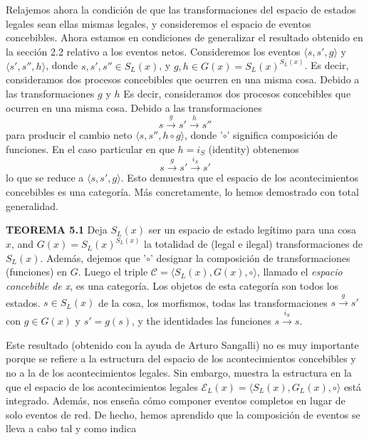 \begin{justifying}
    Relajemos ahora la condición de que las transformaciones del espacio de     estados legales sean ellas mismas legales, y consideremos el espacio de     eventos concebibles. Ahora estamos en condiciones de generalizar el resultado   obtenido en la sección 2.2 relativo a los eventos netos. Consideremos los     eventos $\langle s, s', g \rangle$ y $\langle s', s'', h \rangle$, donde $s,    s', s'' \in S_L(x)$, y $g, h \in G(x) = S_L(x)^{S_L(x)}$. Es decir,    consideramos dos procesos concebibles que ocurren en una misma cosa. Debido a  las transformaciones $g$ y $h$ Es decir, consideramos dos procesos concebibles   que ocurren en una misma cosa. Debido a las transformaciones 
    \[ s \xrightarrow{g} s' \xrightarrow{h} s'' \]
    para producir el cambio neto $\langle s, s'', h \circ g \rangle$, donde     '$\circ$' significa composición de funciones. En el caso particular en que  $h=i_S$ (identity) obtenemos
    \[ s \xrightarrow{g} s' \xrightarrow{i_S} s' \]
    lo que se reduce a $\langle s, s', g \rangle$. Esto demuestra que el espacio    de los acontecimientos concebibles es una categoría. Más concretamente, lo     hemos demostrado con total generalidad.

    \textbf{TEOREMA 5.1} Deja $S_L(x)$ ser un espacio de estado legítimo para una   cosa $x$, and $G(x)=S_L(x)^{S_L(x)}$ la totalidad de (legal e ilegal)     transformaciones de $S_L(x)$. Además, dejemos que '$\circ$' designar la     composición de transformaciones (funciones) en $G$. Luego el triple $\mathcal   {C} = \langle S_L(x), G(x), \circ \rangle$, llamado el \textit{espacio     concebible de x}, es una categoría. Los objetos de esta categoría son todos     los estados. $s \in S_L(x)$ de la cosa, los morfismos, todas las    transformaciones $s \xrightarrow{g} s'$ con $g \in G(x)$ y $s' = g(s)$, y the  identidades las funciones $s \xrightarrow{i_S} s$.

    Este resultado (obtenido con la ayuda de Arturo Sangalli) no es muy     importante porque se refiere a la estructura del espacio de los acontecimientos concebibles  y no a la de los acontecimientos legales. Sin embargo, muestra la estructura en la que   el espacio de los acontecimientos legales $\mathscr{E}_L(x) = \langle S_L(x), G_L(x), \circ  \rangle$ está integrado. Además, nos enseña cómo componer eventos completos en lugar de solo eventos de red. De hecho, hemos aprendido que la composición de eventos se lleva a cabo tal y como indica


\end{justifying}
